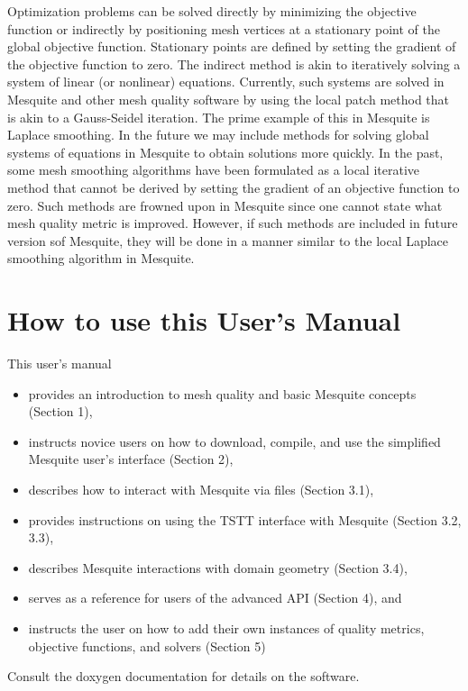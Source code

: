 \documentclass[letter]{report}
\begin{document}
Optimization problems can be solved directly by minimizing the objective 
function or indirectly by positioning mesh vertices at a stationary point
of the global objective function. Stationary points are defined by setting 
the gradient of the objective function to zero. The indirect method is akin 
to iteratively solving a system of linear (or nonlinear) equations. 
Currently, such systems are solved in Mesquite and other mesh quality 
software by using the local patch method that is akin 
to a Gauss-Seidel iteration. The prime example of this in Mesquite is 
Laplace smoothing. In the 
future we may include methods for solving global systems of equations 
in Mesquite to obtain solutions more quickly. 
In the past, some mesh smoothing algorithms have been formulated as a 
local iterative method that cannot be derived  
by setting the gradient of an objective function to zero. Such methods are
frowned upon in Mesquite since one cannot state what mesh quality metric is
improved.  However, if such methods are included in future version sof Mesquite, they will be done in a manner similar to the local Laplace smoothing 
algorithm in Mesquite. \newline


\section{How to use this User's Manual}
This user's manual 
\begin{itemize}
\item provides an introduction to mesh quality and basic Mesquite concepts (Section 1), 
\item instructs novice users on how to download, compile, and use the 
simplified Mesquite user's interface (Section 2),
\item describes how to interact with Mesquite via files (Section 3.1), 
\item provides instructions on using the TSTT interface with Mesquite (Section 3.2, 3.3),
\item describes Mesquite interactions with domain geometry (Section 3.4),
\item serves as a reference for users of the advanced API (Section 4), and 
\item instructs the user on how to add their own instances of quality 
metrics, objective functions, and solvers (Section 5)
\end{itemize}
Consult the doxygen documentation for details on the software. \newline
\end{document}
